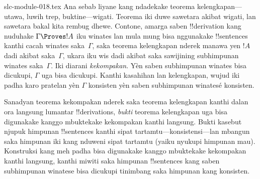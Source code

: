 \begin{filecontents*}[overwrite]{slc-module-018.tex}
Ana sebab liyane kang ndadekake teorema kelengkapan---utawa, luwih
trep, buktine---wigati. Teorema iki duwe sawetara akibat wigati, lan
sawetara bakal kita rembug dhewe. Contone, amarga saben !!{derivation}
kang nuduhake $\Gamma \Proves !A$ iku winates lan mula mung bisa
nggunakake !!{sentence}s kanthi cacah winates saka~$\Gamma$, saka
teorema kelengkapan nderek manawa yen $!A$ dadi akibat saka~$\Gamma$,
ukara iku wis dadi akibat saka sawijining subhimpunan winates
saka~$\Gamma$. Iki diarani \emph{kekompakan}. Yèn saben subhimpunan winates bisa dicukupi,
$\Gamma$ uga bisa dicukupi. Kanthi kasahihan lan kelengkapan, wujud
iki padha karo pratelan yèn $\Gamma$ konsisten yèn saben subhimpunan
winatesé konsisten.

Sanadyan teorema kekompakan nderek saka teorema kelengkapan kanthi
dalan ora langsung lumantar !!{derivation}s, \emph{bukti} teorema
kelengkapan uga bisa digunakake kanggo mbuktekake kekompakan kanthi
langsung. Bukti kasebut njupuk himpunan !!{sentence}s
kanthi sipat tartamtu---konsistensi---lan mbangun  saka
himpunan iki kang nduweni sipat tartamtu (yaiku nyukupi himpunan mau). Konstruksi kang meh padha bisa
digunakake kanggo mbuktekake kekompakan kanthi langsung, kanthi miwiti
saka himpunan !!{sentence}s kang saben subhimpunan winatese bisa
dicukupi tinimbang saka himpunan kang konsisten.


\end{filecontents*}

